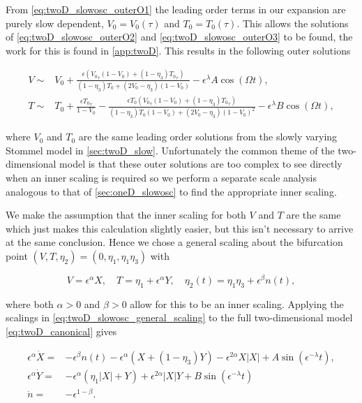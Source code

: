 From \eqref{eq:twoD_slowosc_outerO1} the leading order terms in our expansion are purely slow dependent, $V_0=V_0(\tau)$ and $T_0=T_0(\tau)$. This allows the solutions of \eqref{eq:twoD_slowosc_outerO2} and \eqref{eq:twoD_slowosc_outerO3} to be found, the work for this is found in \autoref{app:twoD}. This results in the following outer solutions 

\begin{equation}\label{eq:twoD_slowosc_outersoln}
\begin{aligned}
V\sim& V_0 + \frac{\epsilon({V_0}_\tau(1-V_0)+(1-\eta_3){T_0}_\tau)}{(1-\eta_3)T_0+(2V_0-\eta_3)(1-V_0)}-\epsilon^\lambda A \cos(\Omega t),\\
T\sim& T_0 + \frac{\epsilon {T_0}_\tau}{1-V_0}-\frac{\epsilon T_0({V_0}_\tau(1-V_0)+(1-\eta_3){T_0}_\tau)}{(1-\eta_3)T_0(1-V_0)+(2V_0-\eta_3)(1-V_0)^2}-\epsilon^\lambda B \cos(\Omega t),
\end{aligned}
\end{equation}

where $V_0$ and $T_0$ are the same leading order solutions from the slowly varying Stommel model in \autoref{sec:twoD_slow}. Unfortunately the common theme of the two-dimensional model is that these outer solutions are too complex to see directly when an inner scaling is required so we perform a separate scale analysis analogous to that of \autoref{sec:oneD_slowosc} to find the appropriate inner scaling.

We make the assumption that the inner scaling for both $V$ and $T$ are the same which just makes this calculation slightly easier, but this isn't necessary to arrive at the same conclusion. Hence we chose a general scaling about the bifurcation point $(V,T,\eta_2)=(0,\eta_1,\eta_1\eta_3)$ with

\begin{equation}\label{eq:twoD_slowosc_general_scaling}
V=\epsilon^\alpha X, \quad T=\eta_1+\epsilon^\alpha Y ,\quad \eta_2(t)=\eta_1\eta_3+\epsilon^\beta n(t),
\end{equation}

where both $\alpha>0$ and $\beta>0$ allow for this to be an inner scaling. Applying the scalings in \eqref{eq:twoD_slowosc_general_scaling} to the full two-dimensional model \eqref{eq:twoD_canonical} gives

\begin{equation}\label{eq:twoD_slowosc_innerscaled}
\begin{aligned}
\epsilon^\alpha \dot{X}=& -\epsilon^\beta n(t)-\epsilon^\alpha (X+(1-\eta_3)Y) - \epsilon^{2\alpha}X|X| +A\sin(\epsilon^{-\lambda}t),\\
\epsilon^\alpha \dot{Y}=&-\epsilon^\alpha(\eta_1|X|+Y)+\epsilon^{2\alpha}|X|Y +B\sin(\epsilon^{-\lambda} t)\\
\dot{n}=&-\epsilon^{1-\beta}.
\end{aligned}
\end{equation}

